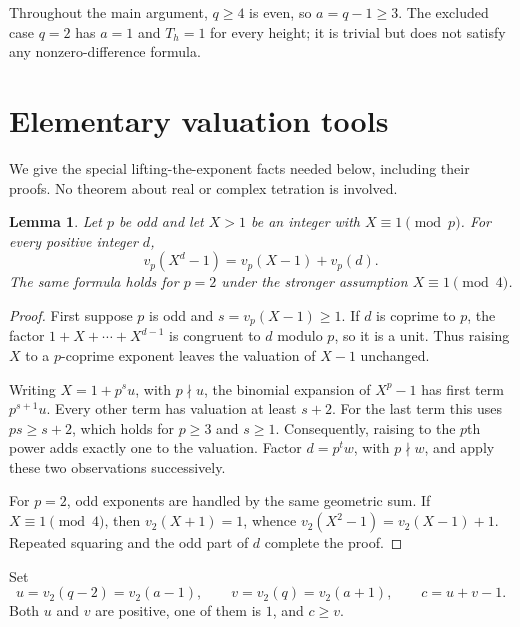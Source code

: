 \documentclass[11pt,a4paper]{article}
\numberwithin{equation}{section}
\theoremstyle{plain}
\newtheorem{lemma}[theorem]{Lemma}
\theoremstyle{definition}
\begin{document}
Throughout the main argument, $q\ge4$ is even, so $a=q-1\ge3$.
The excluded case $q=2$ has $a=1$ and $T_h=1$ for every height; it is
trivial but does not satisfy any nonzero-difference formula.

\section{Elementary valuation tools}\label{sec:lte}

We give the special lifting-the-exponent facts needed below, including
their proofs.  No theorem about real or complex tetration is involved.

\begin{lemma}\label{lem:principal}
Let $p$ be odd and let $X>1$ be an integer with $X\equiv1\pmod p$.  For every positive integer $d$,
\[
 v_p(X^d-1)=v_p(X-1)+v_p(d).
\]
The same formula holds for $p=2$ under the stronger assumption
$X\equiv1\pmod4$.
\end{lemma}
\begin{proof}
First suppose $p$ is odd and $s=v_p(X-1)\ge1$.
If $d$ is coprime to $p$, the factor
$1+X+\cdots+X^{d-1}$ is congruent to $d$ modulo $p$, so it is a unit.
Thus raising $X$ to a $p$-coprime exponent leaves the valuation of
$X-1$ unchanged.

Writing $X=1+p^su$, with $p\nmid u$, the binomial expansion of $X^p-1$
has first term $p^{s+1}u$.  Every other term has valuation at least
$s+2$.  For the last term this uses $ps\ge s+2$, which holds for
$p\ge3$ and $s\ge1$.  Consequently, raising to the $p$th power adds
exactly one to the valuation.  Factor $d=p^tw$, with $p\nmid w$, and
apply these two observations successively.

For $p=2$, odd exponents are handled by the same geometric sum.
If $X\equiv1\pmod4$, then $v_2(X+1)=1$, whence
$v_2(X^2-1)=v_2(X-1)+1$.  Repeated squaring and the odd part of $d$
complete the proof.
\end{proof}

Set
\begin{equation}\label{eq:uvc}
 u=v_2(q-2)=v_2(a-1),\qquad v=v_2(q)=v_2(a+1),\qquad c=u+v-1.
\end{equation}
Both $u$ and $v$ are positive, one of them is $1$, and $c\ge v$.
\end{document}
